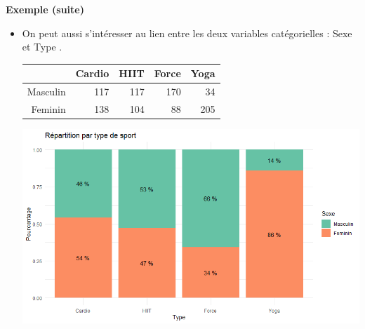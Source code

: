 \documentclass[aspectratio=169,xcolor=dvipsnames]{beamer}
\begin{document}
\begin{frame}
	\begin{exampleblock}{\textbf{Exemple (suite)}}
\begin{footnotesize}
		\begin{itemize}
		\item On peut aussi s'intéresser au lien entre les deux variables catégorielles : \og Sexe \fg{} et \og Type \fg{}.

			\begin{center}
			\begin{tabular}{rrrrr}
  \hline
 & Cardio & HIIT & Force & Yoga \\ 
  \hline
Masculin & 117 & 117 & 170 &  34 \\ 
  Feminin & 138 & 104 &  88 & 205 \\ 
   \hline
			\end{tabular}
			\end{center}
		
			\begin{center}
			\includegraphics[scale=0.35]{barplot_gym1.png}
			\end{center}
		\end{itemize}
\end{footnotesize}
	\end{exampleblock}
\end{frame}
\end{document}
